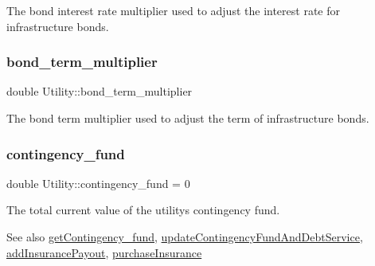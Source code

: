 The bond interest rate multiplier used to adjust the interest rate for infrastructure bonds. 

\mbox{\label{classUtility_a033a19d7bc53d5b879c8b10b159dc6a9}} 
\subsubsection{\texorpdfstring{bond\+\_\+term\+\_\+multiplier}{bond\_term\_multiplier}}
{\footnotesize\ttfamily double Utility\+::bond\+\_\+term\+\_\+multiplier\hspace{0.3cm}{\ttfamily [private]}}



The bond term multiplier used to adjust the term of infrastructure bonds. 

\mbox{\label{classUtility_a24ac3a2a8609d922cbf99292a9ea40e6}} 
\subsubsection{\texorpdfstring{contingency\+\_\+fund}{contingency\_fund}}
{\footnotesize\ttfamily double Utility\+::contingency\+\_\+fund = 0\hspace{0.3cm}{\ttfamily [private]}}



The total current value of the utility\textquotesingle{}s contingency fund. 

\begin{DoxySeeAlso}{See also}
\mbox{\hyperlink{classUtility_ab396bc312d5e5ddc0554138060a8a4d3}{get\+Contingency\+\_\+fund}}, \mbox{\hyperlink{classUtility_ab663efd526505a3d843cae7075cc3b91}{update\+Contingency\+Fund\+And\+Debt\+Service}}, \mbox{\hyperlink{classUtility_a2eaf70b4492ab8ec0e0420d6b7c3b821}{add\+Insurance\+Payout}}, \mbox{\hyperlink{classUtility_a97073e3d7a30275c639484b3158284fa}{purchase\+Insurance}} 
\end{DoxySeeAlso}
\mbox{\label{classUtility_acad95d9c3155e6079281f3afefe03359}} 
